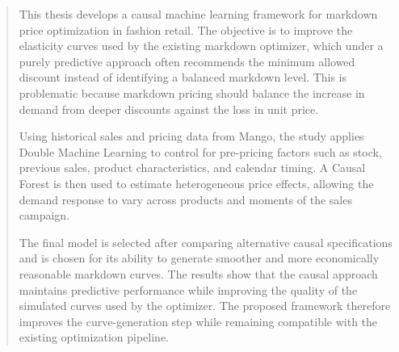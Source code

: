 \documentclass[
11pt, %
english, %
singlespacing, %
headsepline, %
]{MastersDoctoralThesis} %
\begin{document}

\begin{abstract}
\addchaptertocentry{\abstractname} %
This thesis develops a causal machine learning framework for markdown price optimization in fashion retail. The objective is to improve the elasticity curves used by the existing markdown optimizer, which under a purely predictive approach often recommends the minimum allowed discount instead of identifying a balanced markdown level. This is problematic because markdown pricing should balance the increase in demand from deeper discounts against the loss in unit price.

Using historical sales and pricing data from Mango, the study applies Double Machine Learning to control for pre-pricing factors such as stock, previous sales, product characteristics, and calendar timing. A Causal Forest is then used to estimate heterogeneous price effects, allowing the demand response to vary across products and moments of the sales campaign.

The final model is selected after comparing alternative causal specifications and is chosen for its ability to generate smoother and more economically reasonable markdown curves. The results show that the causal approach maintains predictive performance while improving the quality of the simulated curves used by the optimizer. The proposed framework therefore improves the curve-generation step while remaining compatible with the existing optimization pipeline.

\end{abstract}

\end{document}
